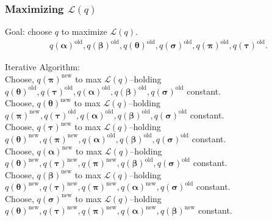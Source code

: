 \documentclass{beamer}
\numberwithin{equation}{section}
\begin{document}
\begin{frame}
\frametitle{Maximizing $\mathcal{L}(q)$}

Goal: choose $q$ to maximize $\mathcal{L}(q)$.  \\

\begin{eqnarray}
q(\boldsymbol{\alpha})^{\text{old}},
q(\boldsymbol{\beta})^{\text{old}}, q(
\boldsymbol{\theta})^{\text{old}},
q(\boldsymbol{\sigma})^{\text{old}},
q(\boldsymbol{\pi})^{\text{old}}, q(\boldsymbol{\tau})^{\text{old}}.
\nonumber
\end{eqnarray}

Iterative Algorithm:  \\
\footnotesize Choose, $q(\boldsymbol{\pi})^{\text{new}}$ to max
$\mathcal{L}(q)$--holding
$q(\boldsymbol{\theta})^{\text{old}},q(\boldsymbol{\tau})^{\text{old}},q(\boldsymbol{\alpha})^{\text{old}},
q(\boldsymbol{\beta})^{\text{old}},q(\boldsymbol{\sigma})^{\text{old}}$
constant. \\
Choose, $q(\boldsymbol{\theta})^{\text{new}}$ to max
$\mathcal{L}(q)$--holding
$q(\boldsymbol{\pi})^{\text{new}},q(\boldsymbol{\tau})^{\text{old}},q(\boldsymbol{\alpha})^{\text{old}},
q(\boldsymbol{\beta})^{\text{old}},q(\boldsymbol{\sigma})^{\text{old}}$
constant. \\
Choose, $q(\boldsymbol{\tau})^{\text{new}}$ to max
$\mathcal{L}(q)$--holding
$q(\boldsymbol{\theta})^{\text{new}},q(\boldsymbol{\pi})^{\text{new}},q(\boldsymbol{\alpha})^{\text{old}},
q(\boldsymbol{\beta})^{\text{old}},q(\boldsymbol{\sigma})^{\text{old}}$
constant. \\
Choose, $q(\boldsymbol{\alpha})^{\text{new}}$ to max
$\mathcal{L}(q)$--holding
$q(\boldsymbol{\theta})^{\text{new}},q(\boldsymbol{\tau})^{\text{new}},q(\boldsymbol{\pi})^{\text{new}},
q(\boldsymbol{\beta})^{\text{old}},q(\boldsymbol{\sigma})^{\text{old}}$
constant. \\
Choose, $q(\boldsymbol{\beta})^{\text{new}}$ to max
$\mathcal{L}(q)$--holding
$q(\boldsymbol{\theta})^{\text{new}},q(\boldsymbol{\tau})^{\text{new}},q(\boldsymbol{\pi})^{\text{new}},
q(\boldsymbol{\alpha})^{\text{new}},q(\boldsymbol{\sigma})^{\text{old}}$
constant. \\
Choose, $q(\boldsymbol{\sigma})^{\text{new}}$ to max
$\mathcal{L}(q)$--holding
$q(\boldsymbol{\theta})^{\text{new}},q(\boldsymbol{\tau})^{\text{new}},q(\boldsymbol{\pi})^{\text{new}},
q(\boldsymbol{\alpha})^{\text{new}},q(\boldsymbol{\beta})^{\text{new}}$
constant.
\end{frame}
\end{document}
